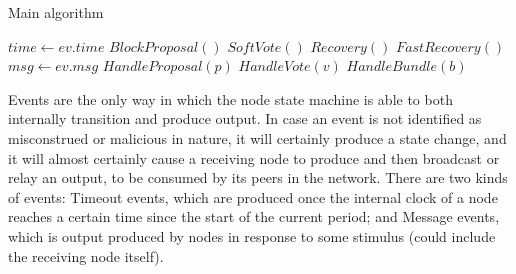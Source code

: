 \documentclass[10pt,a4paper]{article}
\begin{document}
\begin{section}{Main algorithm}


\begin{algorithm}[H]
    \begin{algorithmic}[1]
    
        \State $time \gets ev.time$
            \State $BlockProposal()$
            \State $SoftVote()$
            \State $Recovery()$
            \State $FastRecovery()$
        \EndIf
    \Else %
        \State $msg \gets ev.msg$
            \State $HandleProposal(p)$
            \State $HandleVote(v)$
            \State $HandleBundle(b)$
        \EndIf
    \EndIf

    \EndFunction
    \end{algorithmic}
    \caption{\underline{Main node algorithm}}
\end{algorithm}

Events are the only way in which the node state machine is able to both internally transition and produce output.
In case an event is not identified as misconstrued or malicious in nature, it will certainly produce a state change,
and it will almost certainly cause a receiving node to produce and then broadcast or relay an output, to be consumed
by its peers in the network.
There are two kinds of events: Timeout events, which are produced once the internal clock of a node reaches a certain
time since the start of the current period; and Message events, which is output produced by nodes in response to some stimulus
(could include the receiving node itself).






\end{section}
\end{document}

